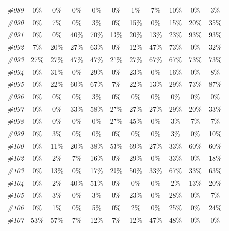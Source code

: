 \begin{table}[t]
\begin{tabular}{ccccccccccc}
    \textit{\#089} & 0\%   & 0\%   & 0\%   & 0\%   & 0\%   & 1\%   & 7\%   & 10\%  & 0\%   & 3\% \\
    \textit{\#090} & 0\%   & 7\%   & 0\%   & 3\%   & 0\%   & 15\%  & 0\%   & 15\%  & 20\%  & 35\% \\
    \textit{\#091} & 0\%   & 0\%   & 40\%  & 70\%  & 13\%  & 20\%  & 13\%  & 23\%  & 93\%  & 93\% \\
    \textit{\#092} & 7\%   & 20\%  & 27\%  & 63\%  & 0\%   & 12\%  & 47\%  & 73\%  & 0\%   & 32\% \\
    \textit{\#093} & 27\%  & 27\%  & 47\%  & 47\%  & 27\%  & 27\%  & 67\%  & 67\%  & 73\%  & 73\% \\
    \textit{\#094} & 0\%   & 31\%  & 0\%   & 29\%  & 0\%   & 23\%  & 0\%   & 16\%  & 0\%   & 8\% \\
    \textit{\#095} & 0\%   & 22\%  & 60\%  & 67\%  & 7\%   & 22\%  & 13\%  & 29\%  & 73\%  & 87\% \\
    \textit{\#096} & 0\%   & 0\%   & 0\%   & 3\%   & 0\%   & 0\%   & 0\%   & 0\%   & 0\%   & 0\% \\
    \textit{\#097} & 0\%   & 0\%   & 33\%  & 58\%  & 27\%  & 27\%  & 27\%  & 29\%  & 20\%  & 33\% \\
    \textit{\#098} & 0\%   & 0\%   & 0\%   & 0\%   & 27\%  & 45\%  & 0\%   & 3\%   & 7\%   & 7\% \\
    \textit{\#099} & 0\%   & 3\%   & 0\%   & 0\%   & 0\%   & 0\%   & 0\%   & 3\%   & 0\%   & 10\% \\
    \textit{\#100} & 0\%   & 11\%  & 20\%  & 38\%  & 53\%  & 69\%  & 27\%  & 33\%  & 60\%  & 60\% \\
    \textit{\#102} & 0\%   & 2\%   & 7\%   & 16\%  & 0\%   & 29\%  & 0\%   & 33\%  & 0\%   & 18\% \\
    \textit{\#103} & 0\%   & 13\%  & 0\%   & 17\%  & 20\%  & 50\%  & 33\%  & 67\%  & 33\%  & 63\% \\
    \textit{\#104} & 0\%   & 2\%   & 40\%  & 51\%  & 0\%   & 0\%   & 0\%   & 2\%   & 13\%  & 20\% \\
    \textit{\#105} & 0\%   & 3\%   & 0\%   & 3\%   & 0\%   & 23\%  & 0\%   & 28\%  & 0\%   & 7\% \\
    \textit{\#106} & 0\%   & 1\%   & 0\%   & 5\%   & 0\%   & 2\%   & 0\%   & 25\%  & 0\%   & 24\% \\
    \textit{\#107} & 53\%  & 57\%  & 7\%   & 12\%  & 7\%   & 12\%  & 47\%  & 48\%  & 0\%   & 0\% \\
    \bottomrule
    \end{tabular}%
  \label{tab:exp_GalaxeaR1Pro_2}%
\end{table}%

